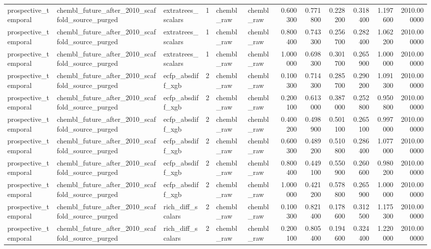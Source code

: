 \begin{longtable}{lllrllrrrrrr}
prospective\_temporal & chembl\_future\_after\_2010\_scaffold\_source\_purged & extratrees\_scalars & 1 & chembl\_raw & chembl\_raw & 0.600300 & 0.771800 & 0.228200 & 0.318400 & 1.197600 & 2010.000000 \\
prospective\_temporal & chembl\_future\_after\_2010\_scaffold\_source\_purged & extratrees\_scalars & 1 & chembl\_raw & chembl\_raw & 0.800400 & 0.743300 & 0.256700 & 0.282400 & 1.062200 & 2010.000000 \\
prospective\_temporal & chembl\_future\_after\_2010\_scaffold\_source\_purged & extratrees\_scalars & 1 & chembl\_raw & chembl\_raw & 1.000000 & 0.698300 & 0.301700 & 0.265900 & 1.000000 & 2010.000000 \\
prospective\_temporal & chembl\_future\_after\_2010\_scaffold\_source\_purged & ecfp\_absdiff\_xgb & 2 & chembl\_raw & chembl\_raw & 0.100300 & 0.714300 & 0.285700 & 0.290200 & 1.091300 & 2010.000000 \\
prospective\_temporal & chembl\_future\_after\_2010\_scaffold\_source\_purged & ecfp\_absdiff\_xgb & 2 & chembl\_raw & chembl\_raw & 0.200100 & 0.613000 & 0.387000 & 0.252800 & 0.950800 & 2010.000000 \\
prospective\_temporal & chembl\_future\_after\_2010\_scaffold\_source\_purged & ecfp\_absdiff\_xgb & 2 & chembl\_raw & chembl\_raw & 0.400200 & 0.498900 & 0.501100 & 0.265100 & 0.997000 & 2010.000000 \\
prospective\_temporal & chembl\_future\_after\_2010\_scaffold\_source\_purged & ecfp\_absdiff\_xgb & 2 & chembl\_raw & chembl\_raw & 0.600300 & 0.489200 & 0.510800 & 0.286400 & 1.077000 & 2010.000000 \\
prospective\_temporal & chembl\_future\_after\_2010\_scaffold\_source\_purged & ecfp\_absdiff\_xgb & 2 & chembl\_raw & chembl\_raw & 0.800400 & 0.449100 & 0.550900 & 0.260600 & 0.980200 & 2010.000000 \\
prospective\_temporal & chembl\_future\_after\_2010\_scaffold\_source\_purged & ecfp\_absdiff\_xgb & 2 & chembl\_raw & chembl\_raw & 1.000000 & 0.421200 & 0.578800 & 0.265900 & 1.000000 & 2010.000000 \\
prospective\_temporal & chembl\_future\_after\_2010\_scaffold\_source\_purged & rich\_diff\_scalars & 2 & chembl\_raw & chembl\_raw & 0.100300 & 0.821400 & 0.178600 & 0.312500 & 1.175300 & 2010.000000 \\
prospective\_temporal & chembl\_future\_after\_2010\_scaffold\_source\_purged & rich\_diff\_scalars & 2 & chembl\_raw & chembl\_raw & 0.200100 & 0.805400 & 0.194600 & 0.324400 & 1.220000 & 2010.000000 \\

\end{longtable}
